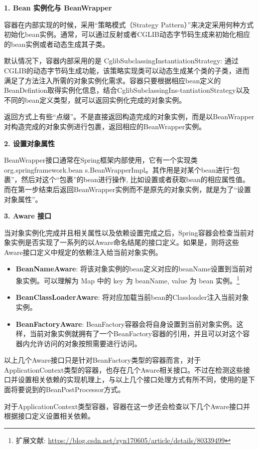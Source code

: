 \noindent\textbf{1. Bean 实例化与 BeanWrapper}

容器在内部实现的时候，采用“策略模式（Strategy Pattern）”来决定采用何种方式初始化bean实例。通常，可以通过反射或者CGLIB动态字节码生成来初始化相应的bean实例或者动态生成其子类。

默认情况下，容器内部采用的是 CglibSubclassingInstantiationStrategy: 通过CGLIB的动态字节码生成功能，该策略实现类可以动态生成某个类的子类，进而满足了方法注入所需的对象实例化需求。容器只要根据相应bean定义的BeanDefintion取得实例化信息，结合CglibSubclassingIns-tantiationStrategy以及不同的bean定义类型，就可以返回实例化完成的对象实例。

返回方式上有些“点缀”。不是直接返回构造完成的对象实例，而是以BeanWrapper对构造完成的对象实例进行包裹，返回相应的BeanWrapper实例。

\noindent\textbf{2. 设置对象属性}

BeanWrapper接口通常在Spring框架内部使用，它有一个实现类 org.springframework.bean s.BeanWrapperImpl。其作用是对某个bean进行“包裹”，然后对这个“包裹”的bean进行操作, 比如设置或者获取bean的相应属性值。而在第一步结束后返回BeanWrapper实例而不是原先的对象实例，就是为了“设置对象属性”。

\noindent\textbf{3. Aware 接口}

当对象实例化完成并且相关属性以及依赖设置完成之后，Spring容器会检查当前对象实例是否实现了一系列的以Aware命名结尾的接口定义。如果是，则将这些Aware接口定义中规定的依赖注入给当前对象实例。

\begin{itemize}
    \item \textbf{BeanNameAware}: 将该对象实例的bean定义对应的beanName设置到当前对象实例。可以理解为 Map 中的 key 为 beanName, value 为 bean 实例。\footnote{扩展文献: \url{https://blog.csdn.net/zyn170605/article/details/80339499}}
    \item \textbf{BeanClassLoaderAware}: 将对应加载当前bean的Classloader注入当前对象实例。
    \item \textbf{BeanFactoryAware}: BeanFactory容器会将自身设置到当前对象实例。这样，当前对象实例就拥有了一个BeanFactory容器的引用，并且可以对这个容器内允许访问的对象按照需要进行访问。
\end{itemize}

以上几个Aware接口只是针对BeanFactory类型的容器而言，对于ApplicationContext类型的容器，也存在几个Aware相关接口。不过在检测这些接口并设置相关依赖的实现机理上，与以上几个接口处理方式有所不同，使用的是下面将要说到的BeanPostProcessor方式。

对于ApplicationContext类型容器，容器在这一步还会检查以下几个Aware接口并根据接口定义设置相关依赖。

